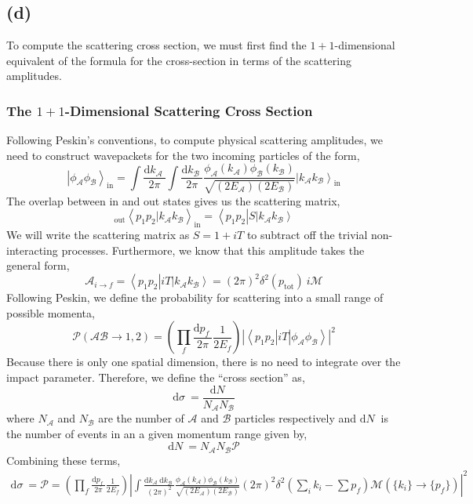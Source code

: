 \documentclass[12pt]{article}
\newcommand{\bra}[1]{\left| #1 \right>}
\newcommand{\ket}[1]{\left| #1 \right>}
\renewcommand{\bra}[1]{\left< #1 \right|}
\newcommand{\inner}[2]{\left< #1 | #2 \right>}
\renewcommand{\d}[1]{ \mathrm{d}#1 \:}
\begin{document}
\subsection{(d)}
To compute the scattering cross section, we must first find the $1+1$-dimensional equivalent of the formula for the cross-section in terms of the scattering amplitudes.

\subsubsection{The $1+1$-Dimensional Scattering Cross Section}

Following Peskin's conventions, to compute physical scattering amplitudes, we need to construct wavepackets for the two incoming particles of the form,
\[ \ket{\phi_{\mathcal{A}} \phi_{\mathcal{B}}}_{\mathrm{in}} = \int \frac{\d{k_{\mathcal{A}}}}{2 \pi} \int \frac{\d{k_{\mathcal{B}}}}{2 \pi} \frac{ \phi_\mathcal{A}(k_\mathcal{A}) \phi_{\mathcal{B}}(k_{\mathcal{B}}) }{ \sqrt{ (2 E_\mathcal{A}) (2 E_{\mathcal{B}}) }} \ket{k_\mathcal{A} k_{\mathcal{B}}}_{\mathrm{in}} \]
The overlap between in and out states gives us the scattering matrix,
\[ {}_{\mathrm{out}} \inner{p_1 p_2}{k_\mathcal{A} k_{\mathcal{B}}}_{\mathrm{in}} = \bra{p_1 p_2} S \ket{k_\mathcal{A} k_{\mathcal{B}}} \]
We will write the scattering matrix as $S = \mathrm{1} + i T$ to subtract off the trivial non-interacting processes. Furthermore, we know that this amplitude takes the general form,
\[ \mathcal{\mathcal{A}}_{i \to f} = \bra{p_1 p_2} iT \ket{k_\mathcal{A} k_{\mathcal{B}}} = (2 \pi )^2 \delta^2(p_{\mathrm{tot}}) \: i \mathcal{M} \] 
Following Peskin, we define the probability for scattering into a small range of possible momenta,
\[ \mathcal{P}(\mathcal{A} \mathcal{B} \to 1,2) = \left( \prod_{f} \frac{\d{p_f}}{2 \pi} \frac{1}{2 E_f} \right) | \bra{p_1 p_2} iT \ket{\phi_\mathcal{A} \phi_{\mathcal{B}}} |^2 \] 
Because there is only one spatial dimension, there is no need to integrate over the impact parameter. Therefore, we define the ``cross section'' as,
\[ \d{\sigma} = \frac{\d{N}}{N_{\mathcal{A}} N_{\mathcal{B}}} \]
where $N_{\mathcal{A}}$ and $N_{\mathcal{B}}$ are the number of $\mathcal{A}$ and $\mathcal{B}$ particles respectively and $\d{N}$ is the number of events in an a given momentum range given by, 
\[ \d{N} = N_{\mathcal{A}} N_{\mathcal{B}} \mathcal{P} \]
Combining these terms,
\begin{align*}
\d{\sigma} = \mathcal{P} = \left( \prod_{f} \frac{\d{p_f}}{2 \pi} \frac{1}{2 E_f} \right) \left| \int \frac{\d{k_{\mathcal{A}}} \d{k_{\mathcal{B}}}}{(2 \pi)^2} \frac{ \phi_\mathcal{A}(k_\mathcal{A}) \phi_{\mathcal{B}}(k_{\mathcal{B}}) }{ \sqrt{ (2 E_\mathcal{A}) (2 E_\mathcal{B}) }} (2 \pi)^2 \delta^2 \left(\sum_{i} k_i -  \sum p_f \right) \mathcal{M}(\{ k_i \} \to \{p_f \}) \right|^2
\end{align*} 
\end{document}
